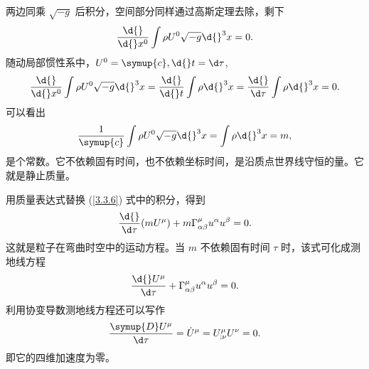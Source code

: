 \documentclass[UTF8, 12pt, a4paper, oneside, onecolumn, fontset=none]{ctexart}
\begin{document}
两边同乘 $\sqrt{-g}$ 后积分，空间部分同样通过高斯定理去除，剩下
\begin{equation}
\frac{\d{}}{\d{}x^{0}}\int\rho U^{0}\sqrt{-g}\d{}^{3}x=0.
\end{equation}
随动局部惯性系中，$U^{0}=\symup{c},\d{}t=\d\tau$,
\begin{equation}
\frac{\d{}}{\d{}x^{0}}\int\rho U^{0}\sqrt{-g}\d{}^{3}x=\frac{\d{}}{\d{}t}\int\rho\d{}^{3}x=\frac{\d{}}{\d\tau}\int\rho\d{}^{3}x=0.
\end{equation}
可以看出
\begin{equation}
\frac{1}{\symup{c}}\int\rho U^{0}\sqrt{-g}\d{}^{3}x=\int\rho\d{}^{3}x=m,
\end{equation}
是个常数。它不依赖固有时间，也不依赖坐标时间，是沿质点世界线守恒的量。它就是静止质量。

用质量表达式替换 (\ref{3.3.6}) 式中的积分，得到
\begin{equation}
\frac{\d{}}{\d\tau}\mleft(mU^{\mu}\mright)+m\Gamma_{\alpha\beta}^{\mu}u^{\alpha}u^{\beta}=0.\label{3.3.11}
\end{equation}
这就是粒子在弯曲时空中的运动方程。当 $m$ 不依赖固有时间 $\tau$ 时，该式可化成测地线方程
\begin{equation}
\frac{\d{}U^{\mu}}{\d\tau}+\Gamma_{\alpha\beta}^{\mu}u^{\alpha}u^{\beta}=0.
\end{equation}
利用协变导数测地线方程还可以写作
\begin{equation}
\dfrac{\symup{D}U^{\mu}}{\d\tau}=\dot{U}^{\mu}=U^{\mu}_{;\nu}U^{\nu}=0.\label{3.3.13}
\end{equation}
即它的四维加速度为零。
\end{document}
